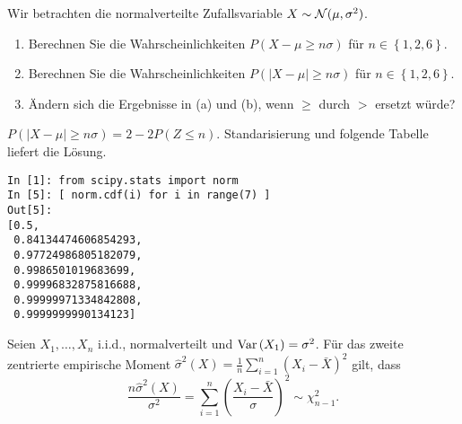 
Wir betrachten die normalverteilte Zufallsvariable $X\sim\mathcal N(\mu, \sigma^2)$. 
\begin{enumerate}
    \item Berechnen Sie die Wahrscheinlichkeiten $P(X - \mu \geq n \sigma)$ für
        $n\in \left\{ 1,2,6 \right\}$.
    \item Berechnen Sie die Wahrscheinlichkeiten $P( | X-\mu| \geq n \sigma)$ für 
        $n\in \left\{ 1,2,6 \right\}$.
    \item \"Andern sich die Ergebnisse in (a) und (b), wenn $\ge$ durch $>$ ersetzt w\"urde? 
\end{enumerate}

\solution $P( |X-\mu| \geq n\sigma ) = 2 - 2P(Z \leq n)$.
Standarisierung und folgende Tabelle liefert die Lösung.
\begin{lstlisting}
In [1]: from scipy.stats import norm
In [5]: [ norm.cdf(i) for i in range(7) ]
Out[5]: 
[0.5,
 0.84134474606854293,
 0.97724986805182079,
 0.9986501019683699,
 0.99996832875816688,
 0.99999971334842808,
 0.9999999990134123]
\end{lstlisting}


Seien $X_1, \ldots, X_n$ i.i.d., normalverteilt und $\operatorname{Var}\left( X_1 \right)=\sigma^2$.
Für das zweite zentrierte empirische  Moment 
$\hat \sigma^2 \left( X \right)= \frac{1}{n} \sum_{i=1}^{n} \left( X_i - \bar X \right)^2 $
gilt, dass
\begin{equation*}
    \frac{n \hat \sigma^2 \left( X \right)}{\sigma^2 } = 
        \sum_{i=1}^{n} \left( \frac{X_i - \bar X}{ \sigma} \right)^2 \sim \chi^2_{n-1}.
\end{equation*}




